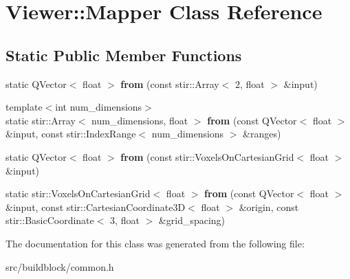 \hypertarget{classViewer_1_1Mapper}{}\section{Viewer\+:\+:Mapper Class Reference}
\label{classViewer_1_1Mapper}
\subsection*{Static Public Member Functions}
\begin{DoxyCompactItemize}
\item 
\mbox{\label{classViewer_1_1Mapper_ad0a5be908ffe8bb35fdff76ffe58c06f}} 
static Q\+Vector$<$ float $>$ {\bfseries from} (const stir\+::\+Array$<$ 2, float $>$ \&input)
\item 
\mbox{\label{classViewer_1_1Mapper_a971705ae10598e69634e11b9f677e0a1}} 
{\footnotesize template$<$int num\+\_\+dimensions$>$ }\\static stir\+::\+Array$<$ num\+\_\+dimensions, float $>$ {\bfseries from} (const Q\+Vector$<$ float $>$ \&input, const stir\+::\+Index\+Range$<$ num\+\_\+dimensions $>$ \&ranges)
\item 
\mbox{\label{classViewer_1_1Mapper_a3fb2e58c9ada63d8c173499b173d0715}} 
static Q\+Vector$<$ float $>$ {\bfseries from} (const stir\+::\+Voxels\+On\+Cartesian\+Grid$<$ float $>$ \&input)
\item 
\mbox{\label{classViewer_1_1Mapper_a11ff9d51a899599171e4470949deb703}} 
static stir\+::\+Voxels\+On\+Cartesian\+Grid$<$ float $>$ {\bfseries from} (const Q\+Vector$<$ float $>$ \&input, const stir\+::\+Cartesian\+Coordinate3D$<$ float $>$ \&origin, const stir\+::\+Basic\+Coordinate$<$ 3, float $>$ \&grid\+\_\+spacing)
\end{DoxyCompactItemize}


The documentation for this class was generated from the following file\+:\begin{DoxyCompactItemize}
\item 
src/buildblock/common.\+h\end{DoxyCompactItemize}
